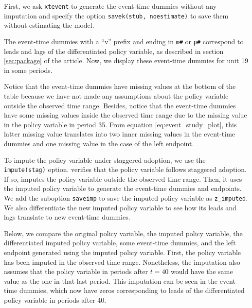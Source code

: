 \documentclass[12pt]{article}
\begin{document}
First, we ask \texttt{xtevent} to generate the event-time dummies without any imputation and specify the option \texttt{savek(stub, noestimate)} to save them without estimating the model.

\begin{stlog}
	\nullskip
\end{stlog}

The event-time dummies with a ``v'' prefix and ending in \texttt{m\#} or \texttt{p\#} correspond to leads and lags of the differentiated policy variable, as described in section \ref{sec:package} of the article.
Now, we display these event-time dummies for unit 19 in some periods.

\begin{stlog}
	\nullskip
\end{stlog}

Notice that the event-time dummies have missing values at the bottom of the table because we have not made any assumptions about the policy variable outside the observed time range.
Besides, notice that the event-time dummies have some missing values inside the observed time range due to the missing value in the policy variable in period 35.
From equation \eqref{eq:event_study_plot}, this latter missing value translates into two inner missing values in the event-time dummies and one missing value in the case of the left endpoint.

To impute the policy variable under staggered adoption, we use the \texttt{impute(stag)} option.
\xtevent verifies that the policy variable follows staggered adoption.
If so, \xtevent imputes the policy variable outside the observed time range.
Then, it uses the imputed policy variable to generate the event-time dummies and endpoints.
We add the suboption \texttt{saveimp} to save the imputed policy variable as \texttt{z\_imputed}.
We also differentiate the new imputed policy variable to see how its leads and lags translate to new event-time dummies.

\begin{stlog}
	\nullskip
\end{stlog}

Below, we compare the original policy variable, the imputed policy variable, the differentiated imputed policy variable, some event-time dummies, and the left endpoint generated using the imputed policy variable.
First, the policy variable has been imputed in the observed time range.
Nonetheless, the imputation also assumes that the policy variable in periods after $t=40$ would have the same value as the one in that last period.
This imputation can be seen in the event-time dummies, which now have zeros corresponding to leads of the differentiated policy variable in periods after 40.
\end{document}
